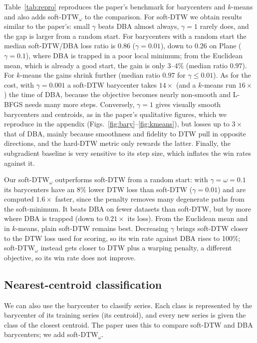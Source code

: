 \documentclass[11pt]{article}
\begin{document}
Table~\ref{tab:repro} reproduces the paper's benchmark for barycenters and $k$-means and also adds soft-DTW$_\omega$ to the comparison. For soft-DTW we obtain results similar to the paper's: small $\gamma$ beats DBA almost always, $\gamma=1$ rarely does, and the gap is larger from a random start. For barycenters with a random start the median soft-DTW/DBA loss ratio is $0.86$ ($\gamma=0.01$), down to $0.26$ on Plane ($\gamma=0.1$), where DBA is trapped in a poor local minimum; from the Euclidean mean, which is already a good start, the gain is only $3$--$4\%$ (median ratio $0.97$). For $k$-means the gains shrink further (median ratio $0.97$ for $\gamma\le0.01$). As for the cost, with $\gamma=0.001$ a soft-DTW barycenter takes $14\times$ (and a $k$-means run $16\times$) the time of DBA, because the objective becomes nearly non-smooth and L-BFGS needs many more steps. Conversely, $\gamma=1$ gives visually smooth barycenters and centroids, as in the paper's qualitative figures, which we reproduce in the appendix (Figs.~\ref{fig:bary}--\ref{fig:kmeans}), but losses up to $3\times$ that of DBA, mainly because smoothness and fidelity to DTW pull in opposite directions, and the hard-DTW metric only rewards the latter. Finally, the subgradient baseline is very sensitive to its step size, which inflates the win rates against it.

Our soft-DTW$_\omega$ outperforms soft-DTW from a random start: with $\gamma=\omega=0.1$ its barycenters have an $8\%$ lower DTW loss than soft-DTW ($\gamma=0.01$) and are computed $1.6\times$ faster, since the penalty removes many degenerate paths from the soft-minimum. It beats DBA on fewer datasets than soft-DTW, but by more where DBA is trapped (down to $0.21\times$ its loss). From the Euclidean mean and in $k$-means, plain soft-DTW remains best. Decreasing $\gamma$ brings soft-DTW closer to the DTW loss used for scoring, so its win rate against DBA rises to 100\%; soft-DTW$_\omega$ instead gets closer to DTW plus a warping penalty, a different objective, so its win rate does not improve.

\subsection{Nearest-centroid classification}
We can also use the barycenter to classify series. Each class is represented by the barycenter of its training series (its centroid), and every new series is given the class of the closest centroid. The paper uses this to compare soft-DTW and DBA barycenters; we add soft-DTW$_\omega$.
\end{document}
